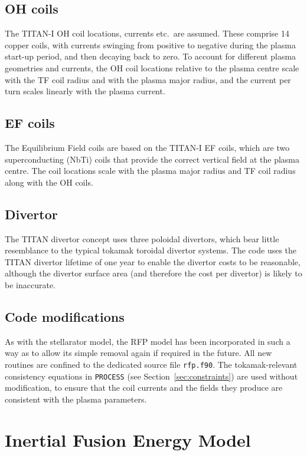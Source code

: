 \documentclass[11pt,a4paper]{report}
\newcommand{\process}{\mbox{\texttt{PROCESS}}}
\begin{document}
\subsection{OH coils}

The TITAN-I OH coil locations, currents etc.\ are assumed. These comprise 14
copper coils, with currents swinging from positive to negative during the
plasma start-up period, and then decaying back to zero. To account for
different plasma geometries and currents, the OH coil locations relative to
the plasma centre scale with the TF coil radius and with the plasma major
radius, and the current per turn scales linearly with the plasma current.

\subsection{EF coils}

The Equilibrium Field coils are based on the TITAN-I EF coils, which are two
superconducting (NbTi) coils that provide the correct vertical field at the
plasma centre. The coil locations scale with the plasma major radius and TF
coil radius along with the OH coils.

\subsection{Divertor}

The TITAN divertor concept uses three poloidal divertors, which bear little
resemblance to the typical tokamak toroidal divertor systems. The code uses
the TITAN divertor lifetime of one year to enable the divertor costs to be
reasonable, although the divertor surface area (and therefore the cost per
divertor) is likely to be inaccurate.

\subsection{Code modifications}

As with the stellarator model, the RFP model has been incorporated in such a
way as to allow its simple removal again if required in the future. All new
routines are confined to the dedicated source file \texttt{rfp.f90}. The
tokamak-relevant consistency equations in \process\/ (see
Section~\ref{sec:constraints}) are used without modification, to ensure that
the coil currents and the fields they produce are consistent with the plasma
parameters.

\section{Inertial Fusion Energy Model}
\label{sec:ife}
\end{document}
